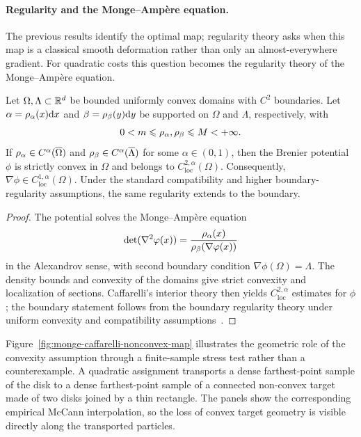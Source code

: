 \paragraph{Regularity and the Monge--Amp\`ere equation.}

The previous results identify the optimal map; regularity theory asks when this map is a classical smooth deformation rather than only an almost-everywhere gradient. For quadratic costs this question becomes the regularity theory of the Monge--Amp\`ere equation.

\begin{prop}\label{prop-caffarelli-regularity}
	Let $\Omega,\Lambda\subset\mathbb{R}^d$ be bounded uniformly convex domains with $C^2$ boundaries. Let $\alpha=\rho_{\alpha}(x)\mathrm{d} x$ and $\beta=\rho_{\beta}(y)\mathrm{d} y$ be supported on $\Omega$ and $\Lambda$, respectively, with
	\[
		0<m\leqslant\rho_{\alpha},\rho_{\beta}\leqslant M<+\infty.
	\]
	If $\rho_{\alpha}\in C^\alpha(\overline\Omega)$ and $\rho_{\beta}\in C^\alpha(\overline\Lambda)$ for some $\alpha\in(0,1)$, then the Brenier potential $\phi$ is strictly convex in $\Omega$ and belongs to $C^{2,\alpha}_{\mathrm{loc}}(\Omega)$. Consequently, $\nabla\phi\in C^{1,\alpha}_{\mathrm{loc}}(\Omega)$. Under the standard compatibility and higher boundary-regularity assumptions, the same regularity extends to the boundary.
\end{prop}
\begin{proof}
	The potential solves the Monge--Amp\`ere equation
	\[
		\det(\nabla^2\varphi(x))
		=\frac{\rho_{\alpha}(x)}{\rho_{\beta}(\nabla\varphi(x))}
	\]
	in the Alexandrov sense, with second boundary condition $\nabla\phi(\Omega)=\Lambda$. The density bounds and convexity of the domains give strict convexity and localization of sections. Caffarelli's interior theory then yields $C^{2,\alpha}_{\mathrm{loc}}$ estimates for $\phi$; the boundary statement follows from the boundary regularity theory under uniform convexity and compatibility assumptions~\cite{caffarelli2003monge,Villani09}.
\end{proof}

Figure~\ref{fig:monge-caffarelli-nonconvex-map} illustrates the geometric role of the convexity assumption through a finite-sample stress test rather than a counterexample. A quadratic assignment transports a dense farthest-point sample of the disk to a dense farthest-point sample of a connected non-convex target made of two disks joined by a thin rectangle. The panels show the corresponding empirical McCann interpolation, so the loss of convex target geometry is visible directly along the transported particles.

